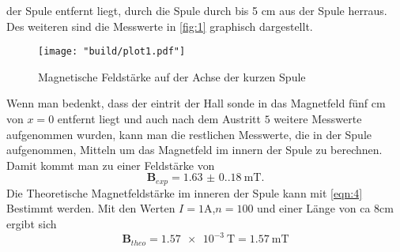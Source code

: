 der Spule entfernt liegt, durch die Spule durch bis 5 \unit{\centi\meter} aus der Spule herraus. Des weiteren 
sind die Messwerte in \autoref{fig:1} graphisch dargestellt.
\begin{figure}
    \caption{Magnetische Feldstärke auf der Achse der kurzen Spule}
    \label{fig:1}
    \centering
    \texttt{[image: "build/plot1.pdf"]}
\end{figure}
Wenn man bedenkt, dass der eintrit der Hall sonde in das Magnetfeld fünf \unit{\centi\meter} 
von $x = 0$ entfernt liegt und auch nach dem Austritt $5$ weitere Messwerte aufgenommen wurden, 
kann man die restlichen Messwerte, die in der Spule aufgenommen, Mitteln um das Magnetfeld im 
innern der Spule zu berechnen. Damit kommt man zu einer Feldstärke von 
\begin{equation*}
    \symbf{B}_{exp} = \qty{1.63(0.18)}{\milli\tesla}.
\end{equation*}
Die Theoretische Magnetfeldstärke im inneren der Spule kann mit \autoref{eqn:4} Bestimmt werden.
Mit den Werten $ I = 1\unit{\ampere}$,$ n = 100 $ und einer Länge von ca 8\unit{\centi\meter}
ergibt sich 
\begin{equation*}
    \symbf{B}_{theo} = \qty{1.57e-3}{\tesla} = \qty{1.57}{\milli\tesla}
\end{equation*}


